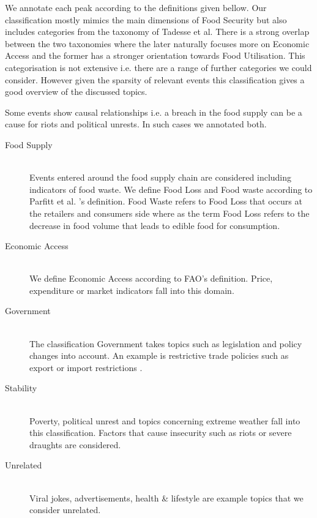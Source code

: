 We annotate each peak according to the definitions given bellow. Our classification mostly mimics the main dimensions of Food Security but also includes categories from the taxonomy of Tadesse et al\cite{Tadesse2014}. There is a strong overlap between the two taxonomies where the later naturally focuses more on Economic Access and the former has a stronger orientation towards Food Utilisation. This categorisation is not extensive i.e. there are a range of further categories we could consider. However given the sparsity of relevant events this classification gives a good overview of the discussed topics. 

Some events show causal relationships i.e. a breach in the food supply can be a cause for riots and political unrests. In such cases we annotated both. 


\begin{description}
  \item[Food Supply ] \hfill \\
 Events entered around the food supply chain are considered including indicators of food waste. We define Food Loss and Food waste according to Parfitt et al. 's \cite{Julian10} definition. Food Waste refers to Food Loss that occurs at the retailers and consumers side where as the term Food Loss refers to the decrease in food volume that leads to edible food for consumption.
  \item[Economic Access] \hfill \\
  We define Economic Access according to FAO's \cite{fao2008} definition. Price, expenditure or market indicators fall into this domain.   
  \item[Government] \hfill \\
  The classification Government takes topics such as legislation and policy changes into account. An example is restrictive trade policies such as export or import restrictions  \cite{Tadesse2014}. 
    \item[Stability] \hfill \\
 Poverty,  political unrest and topics concerning extreme weather \cite{fao2008} fall into this classification. Factors that cause insecurity such as riots or severe draughts are considered. 
    \item[Unrelated] \hfill \\
   Viral jokes,  advertisements, health \& lifestyle are example topics that we consider unrelated. 



\end{description}








